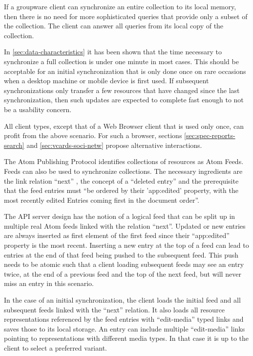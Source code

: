 \documentclass[11pt,a4paper,headsepline,twoside]{scrartcl}		%
\begin{document}
If a groupware client can synchronize an entire collection to its local memory,
then there is no need for more sophisticated queries that provide only a subset
of the collection. The client can answer all queries from its local copy of the
collection.

In \autoref{sec:data-characteristics} it has been shown that the time necessary
to synchronize a full collection is under one minute in most cases. This should
be acceptable for an initial synchronization that is only done once on rare
occasions when a desktop machine or mobile device is first used. If subsequent
synchronizations only transfer a few resources that have changed since the last
synchronization, then such updates are expected to complete fast enough to not
be a usability concern.

All client types, except that of a Web Browser client that is used only once,
can profit from the above scenario. For such a browser, sections
\ref{sec:spec-reports-search} and \ref{sec:vcards-soci-netw} propose alternative
interactions.

The Atom Publishing Protocol identifies collections of resources as Atom
Feeds. Feeds can also be used to synchronize collections. The necessary
ingredients are the link relation ``next'' \cite{RFC5005}, the concept of a
``deleted entry'' \cite{draft-snell-atompub-tombstones-14} and the prerequisite
that the feed entries must ``be ordered by their 'app:edited' property, with the
most recently edited Entries coming first in the document
order''\cite[sec. 10]{RFC5023}.

The API server design has the notion of a logical feed that can be split up in
multiple real Atom feeds linked with the relation ``next''. Updated or new
entries are always inserted as first element of the first feed since their
``app:edited'' property is the most recent. Inserting a new entry at the top of
a feed can lead to entries at the end of that feed being pushed to the
subsequent feed. This push needs to be atomic such that a client loading
subsequent feeds may see an entry twice, at the end of a previous feed and the
top of the next feed, but will never miss an entry in this scenario.

In the case of an initial synchronization, the client loads the initial feed and
all subsequent feeds linked with the ``next'' relation. It also loads all
resource representations referenced by the feed entries with ``edit-media''
typed links and saves those to its local storage. An entry can include multiple
``edit-media'' links pointing to representations with different media types. In
that case it is up to the client to select a preferred variant.
\end{document}
